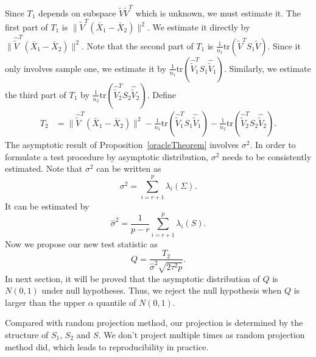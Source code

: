 Since $T_1$ depends on subspace $\tilde{V}\tilde{V}^T$ which is unknown, we must estimate it.
The first part of $T_1$ is $\|\tilde{V}^T (\bar{X}_1-\bar{X}_2)\|^2$.
We estimate it directly by $\|\hat{\tilde{V}}^T (\bar{X}_1-\bar{X}_2)\|^2$.
Note that the second part of $T_1$ is $\frac{1}{n_1}\mathrm{tr}(\tilde{V}^T S_1\tilde{V})$. Since it only involves sample one,
we estimate it by $\frac{1}{n_1}\mathrm{tr}(\hat{\tilde{V}}_1^T S_1\hat{\tilde{V}}_1)$. Similarly, we estimate the third part of $T_1$ by $\frac{1}{n_2}\mathrm{tr}(\hat{\tilde{V}}_2^T S_2\hat{\tilde{V}}_2)$.
Define
\begin{equation*}
\begin{aligned}
    T_2&=\|\hat{\tilde{V}}^T(\bar{X}_1-\bar{X}_2)\|^2-\frac{1}{n_1}\mathrm{tr}(\hat{\tilde{V}}_1^T S_1\hat{\tilde{V}}_1)-\frac{1}{n_2}\mathrm{tr}(\hat{\tilde{V}}_2^T S_2\hat{\tilde{V}}_2).
\end{aligned}
\end{equation*}
The asymptotic result of Proposition~\ref{oracleTheorem} involves $\sigma^2$.
In order to formulate a test procedure by asymptotic distribution, $\sigma^2$ needs to be consistently estimated.
Note that $\sigma^2$ can be written as
\begin{equation}\label{jjjVariance}
    \sigma^2=\sum_{i=r+1}^{p}\lambda_i(\Sigma).
\end{equation}
It can be estimated by
\begin{equation*}
    \hat{\sigma}^2=\frac{1}{p-r}\sum_{i=r+1}^{p} \lambda_i(S).
\end{equation*}
Now we propose our new test statistic as
\begin{equation}\label{myTest}
    Q=\frac{T_2}{\hat{\sigma}^2\sqrt{2\tau^2 p}}.
\end{equation}
In next section, it will be proved that  the asymptotic distribution of $Q$ is $N(0,1)$ under null hypotheses. Thus, we reject the null hypothesis when $Q$ is larger than the upper $\alpha$ quantile of $N(0,1)$.

\begin{remark}
    Compared with random projection method, our projection is determined by the structure of $S_1$, $S_2$ and $S$.
    We don't  project multiple times as random projection method did, which leads to reproducibility in practice.
\end{remark}


